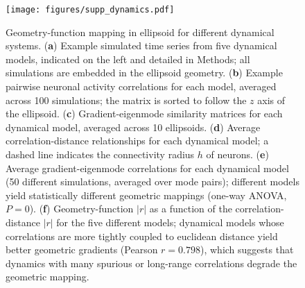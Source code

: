 \documentclass{article}
\begin{document}
\begin{figure}[t]
    \centering
    \texttt{[image: figures/supp\_dynamics.pdf]}
    \caption{Geometry-function mapping in ellipsoid for different dynamical systems. (\textbf{a}) Example simulated time series from five dynamical models, indicated on the left and detailed in Methods; all simulations are embedded in the ellipsoid geometry. (\textbf{b}) Example pairwise neuronal activity correlations for each model, averaged across 100 simulations; the matrix is sorted to follow the $z$ axis of the ellipsoid. (\textbf{c}) Gradient-eigenmode similarity matrices for each dynamical model, averaged across 10 ellipsoids. (\textbf{d}) Average correlation-distance relationships for each dynamical model; a dashed line indicates the connectivity radius $h$ of neurons. (\textbf{e}) Average gradient-eigenmode correlations for each dynamical model (50 different simulations, averaged over mode pairs); different models yield statistically different geometric mappings (one-way ANOVA, $P=0$). (\textbf{f}) Geometry-function $|r|$ as a function of the correlation-distance $|r|$ for the five different models; dynamical models whose correlations are more tightly coupled to euclidean distance yield better geometric gradients (Pearson $r=0.798$), which suggests that dynamics with many spurious or long-range correlations degrade the geometric mapping. }
    \label{supp_dynamics}
\end{figure}

\newpage
\end{document}
